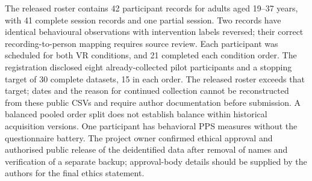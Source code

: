 The released roster contains 42 participant records for adults aged 19--37 years, with 41 complete session records and one partial session. Two records have identical behavioural observations with intervention labels reversed; their correct recording-to-person mapping requires source review. Each participant was scheduled for both VR conditions, and 21 completed each condition order. The registration disclosed eight already-collected pilot participants and a stopping target of 30 complete datasets, 15 in each order. The released roster exceeds that target; dates and the reason for continued collection cannot be reconstructed from these public CSVs and require author documentation before submission. A balanced pooled order split does not establish balance within historical acquisition versions. One participant has behavioral PPS measures without the questionnaire battery. The project owner confirmed ethical approval and authorised public release of the deidentified data after removal of names and verification of a separate backup; approval-body details should be supplied by the authors for the final ethics statement.
